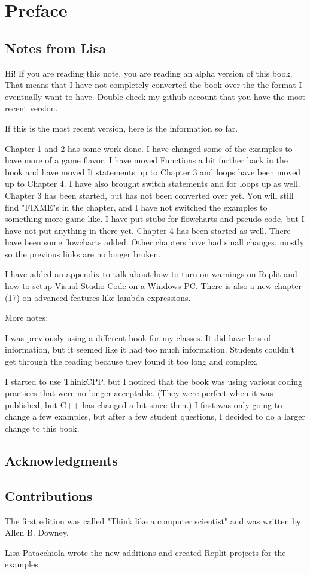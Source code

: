 
\chapter{Preface}

\section{Notes from Lisa}
Hi! If you are reading this note, you are reading an alpha version of this book. That means that I have not completely converted the book over the the format I eventually want to have. Double check my github account that you have the most recent version.

If this is the most recent version, here is the information so far.

Chapter 1 and 2 has some work done. I have changed some of the examples to have more of a game flavor. I have moved Functions a bit further back in the book and have moved If statements up to Chapter 3 and loops have been moved up to Chapter 4. I have also brought switch statements and for loops up as well. Chapter 3 has been started, but has not been converted over yet. You will still find "FIXME"s in the chapter, and I have not switched the examples to something more game-like. I have put stubs for flowcharts and pseudo code, but I have not put anything in there yet. Chapter 4 has been started as well. There have been some flowcharts added. Other chapters have had small changes, mostly so the previous links are no longer broken.

I have added an appendix to talk about how to turn on warnings on Replit and how to setup Visual Studio Code on a Windows PC. There is also a new chapter (17) on advanced features like lambda expressions. 


More notes:

I was previously using a different book for my classes. It did have lots of information, but it seemed like it had too much information. Students couldn't get through the reading because they found it too long and complex.

I started to use ThinkCPP, but I noticed that the book was using various coding practices that were no longer acceptable. (They were perfect when it was published, but C++ has changed a bit since then.) I first was only going to change a few examples, but after a few student questions, I decided to do a larger change to this book.


\section{Acknowledgments}

\section{Contributions}
The first edition was called "Think like a computer scientist" and was written by Allen B. Downey. 

Lisa Patacchiola wrote the new additions and created Replit projects for the examples. 


